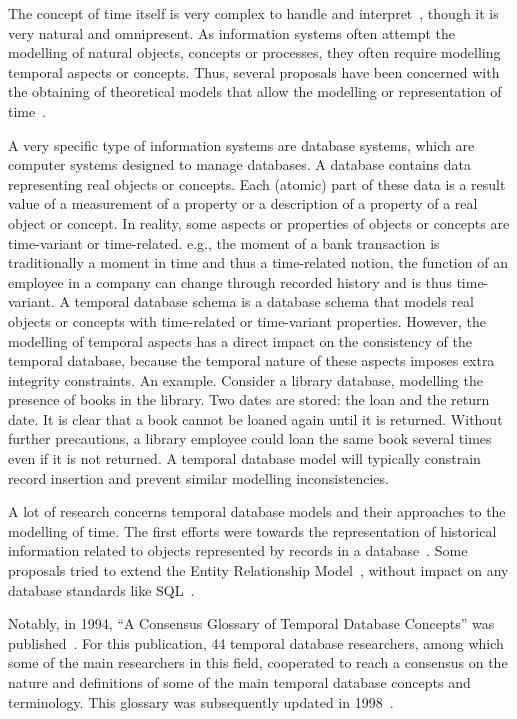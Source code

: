 %
%

The concept of time itself is very complex to handle and interpret~\cite{Klein1994,Shackle1961}, though it is very natural and omnipresent. As information systems often attempt the modelling of natural objects, concepts or processes, they often require modelling temporal aspects or concepts. Thus, several proposals have been concerned with the obtaining of theoretical models that allow the modelling or representation of time~\cite{Bolour1982,VanderCruyssen1997}.

A very specific type of information systems are database systems, which are computer systems designed to manage databases. A database contains data representing real objects or concepts. Each (atomic) part of these data is a result value of a measurement of a property or a description of a property of a real object or concept. In reality, some aspects or properties of objects or concepts are time-variant or time-related. e.g., the moment of a bank transaction is traditionally a moment in time and thus a time-related notion, the function of an employee in a company can change through recorded history and is thus time-variant. A temporal database schema is a database schema that models real objects or concepts with time-related or time-variant properties. However, the modelling of temporal aspects has a direct impact on the consistency of the temporal database, because the temporal nature of these aspects imposes extra integrity constraints. An example. Consider a library database, modelling the presence of books in the library. Two dates are stored: the loan and the return date. It is clear that a book cannot be loaned again until it is returned. Without further precautions, a library employee could loan the same book several times even if it is not returned. A temporal database model will typically constrain record insertion and prevent similar modelling inconsistencies.

A lot of research concerns temporal database models and their approaches to the modelling of time. The first efforts were towards the representation of historical information related to objects represented by records in a database~\cite{Clifford1985}. Some proposals tried to extend the Entity Relationship Model~\cite{Klopprogge1983}, without impact on any database standards like SQL~\cite{Sarda1990}.

Notably, in 1994, ``A Consensus Glossary of Temporal Database Concepts'' was published~\cite{Dyreson1994}. For this publication, 44 temporal database researchers, among which some of the main researchers in this field, cooperated to reach a consensus on the nature and definitions of some of the main temporal database concepts and terminology. This glossary was subsequently updated in 1998~\cite{Dyreson1998}.

